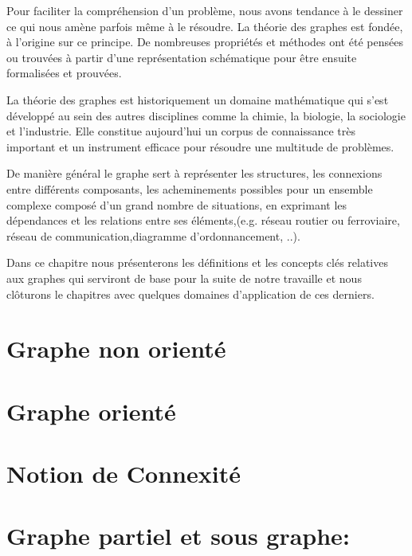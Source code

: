 Pour faciliter la compréhension d’un problème, nous avons tendance à  le dessiner ce qui nous amène parfois même à le résoudre. La théorie des graphes est fondée, à l’origine sur ce principe. De nombreuses propriétés et méthodes ont été pensées ou trouvées à partir d’une représentation schématique pour être ensuite formalisées et prouvées.


La théorie des graphes est historiquement un domaine mathématique qui s’est développé  au sein des autres disciplines comme la chimie, la biologie, la sociologie et l'industrie. Elle constitue aujourd'hui un corpus de connaissance très important et un instrument efficace pour résoudre une multitude de problèmes.


De manière général le graphe sert à représenter les structures, les connexions entre différents composants, les acheminements possibles pour un ensemble complexe composé d'un grand nombre de situations, en exprimant les dépendances et les relations entre ses éléments,(e.g. réseau routier ou ferroviaire, réseau de communication,diagramme d'ordonnancement, ..). 


Dans ce chapitre nous présenterons les définitions et les concepts clés relatives aux graphes qui serviront de base pour la suite de notre travaille et nous clôturons le chapitres avec quelques domaines d'application de ces derniers.

	
	\section{Graphe non orienté}
		
			
	\section{Graphe orienté}	
		
		
	\section{Notion de Connexité}
	
	
	
	
	
	\section{Graphe partiel et sous graphe:}
    				
	

